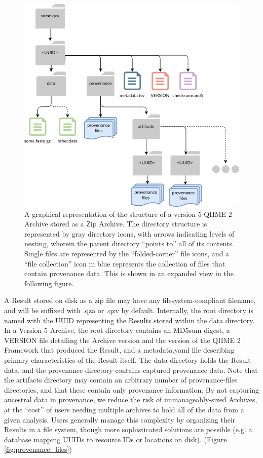 \begin{figure}[htbp]
\centering
\includegraphics[width=\textwidth]{figures/archive_structure.png}
\caption[Diagram of the structure of a version-5 QIIME 2 Archive]%
{A graphical representation of the structure of a version 5 QIIME 2 Archive
stored as a Zip Archive. The directory structure is represented by gray
directory icons, with arrows indicating levels of nesting, wherein the parent
directory “points to” all of its contents. Single files are represented by the
“folded-corner” file icons, and a “file collection” icon in blue represents the
collection of files that contain provenance data. This is shown in an expanded
view in the following figure.}
\label{fig:archive_structure}
\end{figure}
A Result stored on disk as a zip file may have any filesystem-compliant
filename, and will be suffixed with .qza or .qzv by default. Internally, the
root directory is named with the UUID representing the Results stored within the
data directory. In a Version 5 Archive, the root directory contains an MD5sum
digest, a VERSION file detailing the Archive version and the version of the
QIIME 2 Framework that produced the Result, and a metadata.yaml file describing
primary characteristics of the Result itself. The data directory holds the
Result data, and the provenance directory contains captured provenance data.
Note that the artifacts directory may contain an arbitrary number of
provenance-files directories, and that these contain only provenance
information. By not capturing ancestral data in provenance, we reduce the risk
of unmanageably-sized Archives, at the “cost” of users needing multiple archives
to hold all of the data from a given analysis. Users generally manage this
complexity by organizing their Results in a file system, though more
sophisticated solutions are possible (e.g. a database mapping UUIDs to resource
IDs or locations on disk). (Figure \ref{fig:provenance_files})

